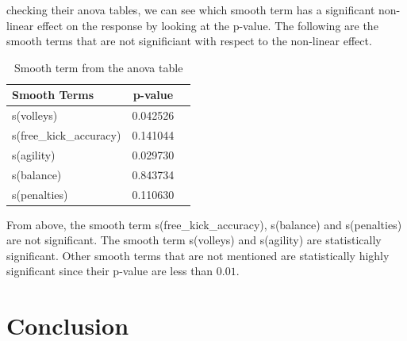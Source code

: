 \documentclass[11pt]{article}
\begin{document}
\noindent checking their anova tables, we can see which smooth term has a significant non-linear effect on the response by looking at the p-value. The following are the smooth terms that are not significiant with respect to the non-linear effect.\\
\begin{table}[h]
    \label{default_model}
    \centering
    \begin{tabular}{l c c}
        \hline
        \textbf{Smooth Terms} & \textbf{p-value}\\ \hline
        s(volleys) & 0.042526 \\
        s(free\_kick\_accuracy) & 0.141044 \\
        s(agility) & 0.029730\\
        s(balance) & 0.843734\\
        s(penalties) & 0.110630\\
        \hline
    \end{tabular}
    \caption{Smooth term from the anova table}
\end{table}

\noindent From above, the smooth term s(free\_kick\_accuracy), s(balance) and s(penalties) are not significant. The smooth term s(volleys) and s(agility) are statistically significant. Other smooth terms that are not mentioned are statistically highly significant since their p-value are less than $0.01$.

\section{Conclusion}
\end{document}
